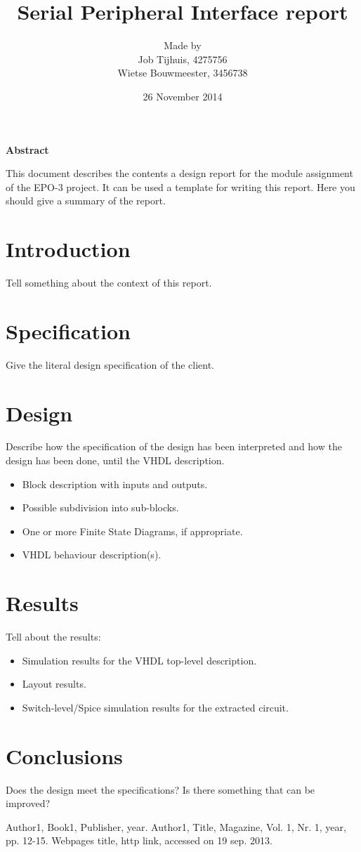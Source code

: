 \documentclass[11pt,twoside,a4paper]{article}
\title{Serial Peripheral Interface report}
\author{
Made by\\
Job Tijhuis, 4275756\\
Wietse Bouwmeester, 3456738\\
}
\date{26 November 2014}
\begin{document}
\maketitle
\thispagestyle{empty}
\vspace{30 mm}
\begin{center}
\Large \bf 
Abstract
\end{center}
This document describes the contents a design report for the module assignment of the EPO-3 project. 
It can be used a template for writing this report. 
Here you should give a summary of the report.
\clearpage

\tableofcontents
\clearpage

\section{Introduction}
Tell something about the context of this report.

\section{Specification}
Give the literal design specification of the client.

\section{Design}
Describe how the specification of the design has been interpreted and how the design 
has been done, until the VHDL description.
\begin{itemize}
\item
Block description with inputs and outputs.
\item
Possible subdivision into sub-blocks.
\item
One or more Finite State Diagrams, if appropriate.
\item
VHDL behaviour description(s).
\end{itemize}

\section{Results}
Tell about the results:
\begin{itemize}
\item
Simulation results for the VHDL top-level description.
\item
Layout results.
\item
Switch-level/Spice simulation results for the extracted circuit.
\end{itemize}

\section{Conclusions}
Does the design meet the specifications?
Is there something that can be improved?

\begin{thebibliography}{9}
Author1, 
Book1, 
Publisher, 
year.
Author1, 
Title, 
Magazine, 
Vol. 1, 
Nr. 1, 
year, 
pp. 12-15.
Webpages title, 
http link, 
accessed on 19 sep. 2013.
\end{thebibliography}
\end{document}
